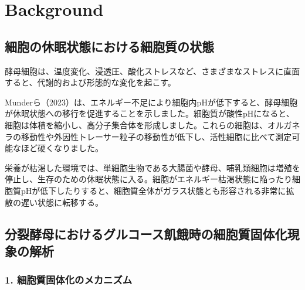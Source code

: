 \chapter{Background}

\section{細胞の休眠状態における細胞質の状態}

酵母細胞は、温度変化、浸透圧、酸化ストレスなど、さまざまなストレスに直面すると、代謝的および形態的な変化を起こす。

Munderら（2023）は、エネルギー不足により細胞内pHが低下すると、酵母細胞が休眠状態への移行を促進することを示しました。細胞質が酸性pHになると、細胞は体積を縮小し、高分子集合体を形成しました。これらの細胞は、オルガネラの移動性や外因性トレーサー粒子の移動性が低下し、活性細胞に比べて測定可能なほど硬くなりました。

栄養が枯渇した環境では、単細胞生物である大腸菌や酵母、哺乳類細胞は増殖を停止し、生存のための休眠状態に入る。細胞がエネルギー枯渇状態に陥ったり細胞質pHが低下したりすると、細胞質全体がガラス状態とも形容される非常に拡散の遅い状態に転移する。


\section{分裂酵母におけるグルコース飢餓時の細胞質固体化現象の解析}

\subsection{1. 細胞質固体化のメカニズム}

